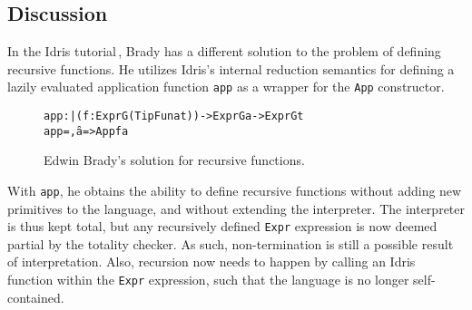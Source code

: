 \subsection{Discussion}

In the Idris tutorial\,\cite{Brady:IdrisTutorial}, Brady has a different solution to the problem of defining recursive functions. He utilizes Idris's internal reduction semantics for defining a lazily evaluated application function \texttt{app} as a wrapper for the \texttt{App} constructor. 

\begin{figure}
\begin{alltt}
app : |(f : Expr G (TipFun a t)) -> Expr G a -> Expr G t
app = \f, a => App f a
\end{alltt}
\caption{Edwin Brady's solution for recursive functions.}
\end{figure}

With \texttt{app}, he obtains the ability to define recursive functions without adding new primitives to the language, and without extending the interpreter. The interpreter is thus kept total, but any recursively defined \texttt{Expr} expression is now deemed partial by the totality checker. As such, non-termination is still a possible result of interpretation. Also, recursion now needs to happen by calling an Idris function within the \texttt{Expr} expression, such that the language is no longer self-contained.